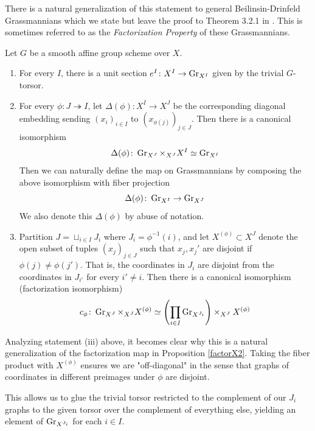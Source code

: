 \documentclass[12pt]{article}
\begin{document}
There is a natural generalization of this statement to general Beilinsin-Drinfeld Grassmannians which we state but leave the proof to Theorem 3.2.1 in \cite{Zhu2016}. This is sometimes referred to as the \textit{Factorization Property} of these Grassmannians. 
\begin{thm}\label{factorization}
    Let $G$ be a smooth affine group scheme over $X$. 
    \begin{enumerate}
        \item For every $I$, there is a unit section $e^I \colon X^I \to \operatorname{Gr}_{X^I}$ given by the trivial $G$-torsor.
        \item For every $\phi \colon J \twoheadrightarrow I$, let $\Delta(\phi) \colon X^I \to X^J$ be the corresponding diagonal embedding sending $(x_i)_{i \in I}$ to $(x_{\phi(j)})_{j \in J}$. Then there is a canonical isomorphism
        \begin{equation}
            \Delta(\phi) \colon \operatorname{Gr}_{X^J} \times_{X^J} X^I \simeq \operatorname{Gr}_{X^I}
        \end{equation}
        Then we can naturally define the map on Grassmannians by composing the above isomorphism with fiber projection
        \[\Delta(\phi) \colon \operatorname{Gr}_{X^I} \to \operatorname{Gr}_{X^J}\]
        We also denote this $\Delta(\phi)$ by abuse of notation.
        \item Partition $J = \sqcup_{i \in I} J_{i}$ where $J_i = \phi^{-1}(i)$, and let $X^{(\phi)} \subset X^J$ denote the open subset of tuples $(x_j)_{j \in J}$ such that $x_j, x_j'$ are disjoint if $\phi(j) \neq \phi(j')$. That is, the coordinates in $J_i$ are disjoint from the coordinates in $J_{i'}$ for every $i' \neq i$. Then there is a canonical isomorphism (factorization isomorphism)
        \begin{equation}
            c_{\phi} \colon \operatorname{Gr}_{X^J} \times_{X^J} X^{(\phi)} \simeq \left(\prod_{i \in I} \operatorname{Gr}_{X^{J_i}}\right) \times_{X^J} X^{(\phi)}
        \end{equation}
    \end{enumerate}
\end{thm}
Analyzing statement (iii) above, it becomes clear why this is a natural generalization of the factorization map in Proposition \ref{factorX2}. Taking the fiber product with $X^{(\phi)}$ ensures we are "off-diagonal" in the sense that graphs of coordinates in different preimages under $\phi$ are disjoint. 

This allows us to glue the trivial torsor restricted to the complement of our $J_i$ graphs to the given torsor over the complement of everything else, yielding an element of $\operatorname{Gr}_{X^{J_i}}$ for each $i \in I$.
\end{document}
